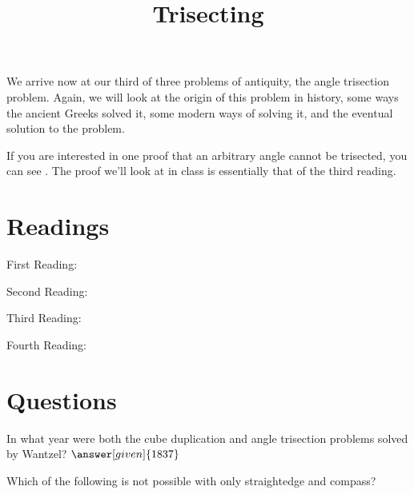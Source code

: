 \documentclass{ximera}
\title{Trisecting}
\begin{document}
\begin{abstract}
\end{abstract}
\maketitle

We arrive now at our third of three problems of antiquity, the angle trisection problem.  Again, we will look at the origin of this problem in history, some ways the ancient Greeks solved it, some modern ways of solving it, and the eventual solution to the problem.

If you are interested in one proof that an arbitrary angle cannot be trisected, you can see .  The proof we'll look at in class is essentially that of the third reading.


\section{Readings}

First Reading: 

Second Reading: 

Third Reading: 

Fourth Reading: 




\section{Questions}

\begin{question}
In what year were both the cube duplication and angle trisection problems solved by Wantzel? $\answer[given]{1837}$
\end{question}


\begin{question}
Which of the following is not possible with only straightedge and compass?
\begin{multipleChoice}
\end{multipleChoice}
\end{question}



%
\end{document}
